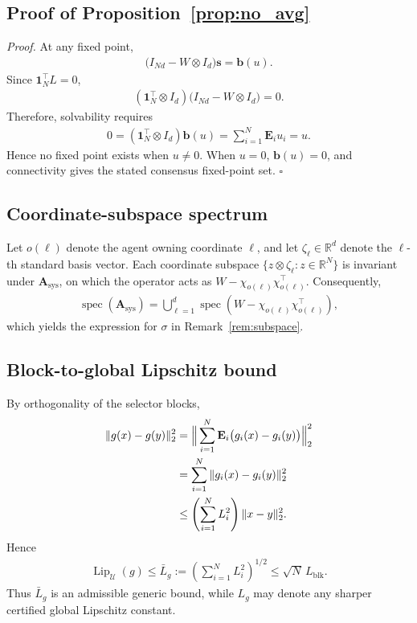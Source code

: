 \documentclass[letterpaper, 10 pt, conference]{ieeeconf} %
\newenvironment{proof}[1][Proof]{\par\noindent\textit{#1. }\ignorespaces}
  {\hfill$\square$\par}
\begin{document}
\subsection{Proof of Proposition~\ref{prop:no_avg}}
\begin{proof}
At any fixed point,
\begin{align}
\bigl(I_{Nd}-W\otimes I_d\bigr)\mathbf s
=
\mathbf b(u).
\end{align}
Since \(\mathbf1_N^\top L=0\),
\begin{align}
(\mathbf1_N^\top\otimes I_d)
\bigl(I_{Nd}-W\otimes I_d\bigr)=0.
\end{align}
Therefore, solvability requires
\begin{align}
0
=
(\mathbf1_N^\top\otimes I_d)\mathbf b(u)
=
\sum_{i=1}^N\mathbf E_i u_i
=
u.
\end{align}
Hence no fixed point exists when \(u\neq0\). When \(u=0\), \(\mathbf b(u)=0\), and connectivity gives the stated consensus fixed-point set.
\end{proof}

\subsection{Coordinate-subspace spectrum}
Let \(o(\ell)\) denote the agent owning coordinate \(\ell\), and let \(\zeta_\ell\in\mathbb R^d\) denote the \(\ell\)-th standard basis vector. Each coordinate subspace \(\{z\otimes \zeta_\ell:z\in\mathbb R^N\}\) is invariant under \(\mathbf A_{\mathrm{sys}}\), on which the operator acts as \(W-\chi_{o(\ell)}\chi_{o(\ell)}^\top\). Consequently,
\begin{align}
\operatorname{spec}(\mathbf A_{\mathrm{sys}})
=
\bigcup_{\ell=1}^{d}
\operatorname{spec}\!\left(
W-\chi_{o(\ell)}\chi_{o(\ell)}^\top
\right),
\end{align}
which yields the expression for \(\sigma\) in Remark~\ref{rem:subspace}.

\subsection{Block-to-global Lipschitz bound}
By orthogonality of the selector blocks,
\begin{align}
\|g(x)-g(y)\|_2^2
&=
\Big\|\sum_{i=1}^N
\mathbf E_i\bigl(g_i(x)-g_i(y)\bigr)\Big\|_2^2
\notag\\
&=
\sum_{i=1}^N
\|g_i(x)-g_i(y)\|_2^2
\notag\\
&\le
\left(\sum_{i=1}^N L_i^2\right)
\|x-y\|_2^2.
\end{align}
Hence
\begin{align}
\operatorname{Lip}_{\mathcal U}(g)
\le
\bar L_g
:=
\left(\sum_{i=1}^N L_i^2\right)^{1/2}
\le
\sqrt N\,L_{\mathrm{blk}}.
\end{align}
Thus \(\bar L_g\) is an admissible generic bound, while \(L_g\) may denote any sharper certified global Lipschitz constant.
\end{document}
